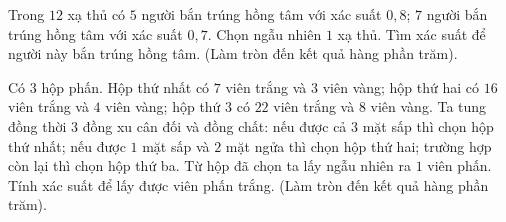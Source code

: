 \begin{ex}%
Trong $12$ xạ thủ có $5$ người bắn trúng hồng tâm với xác suất $0{,}8$; $7$ người bắn trúng hồng tâm với xác suất $0{,}7$. Chọn ngẫu nhiên $1$ xạ thủ. Tìm xác suất để người này bắn trúng hồng tâm.  (Làm tròn đến kết quả hàng phần trăm).
\end{ex}

\begin{ex}%
 Có $3$ hộp phấn. Hộp thứ nhất có $7$ viên trắng và $3$ viên vàng; hộp thứ hai có $16$ viên trắng và $4$ viên vàng; hộp thứ $3$ có $22$ viên trắng và $8$ viên vàng. Ta tung đồng thời $3$ đồng xu cân đối và đồng chất: nếu được cả $3$ mặt sấp thì chọn hộp thứ nhất; nếu được $1$ mặt sấp và $2$ mặt ngửa thì chọn hộp thứ hai; trường hợp còn lại thì chọn hộp thứ ba. Từ hộp đã chọn ta lấy ngẫu nhiên ra $1$ viên phấn. Tính xác suất để lấy được viên phấn trắng. (Làm tròn đến kết quả hàng phần trăm).
\end{ex}

